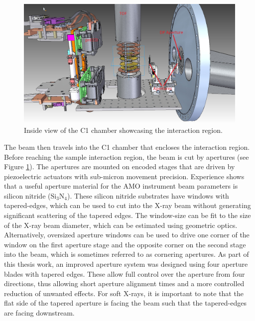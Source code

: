 \begin{figure}
	\centering
		\includegraphics[width=1.00\textwidth]{images/c1-ccd-spec.jpg}
	\caption{Inside view of the C1 chamber showcasing the interaction region.}
	\label{fig:c1-ccd-spec}
\end{figure}
%
The beam then travels into the C1 chamber that encloses the interaction region. Before reaching the sample interaction region, the beam is cut by apertures (see Figure \ref{fig:c1-ccd-spec}). The apertures are mounted on encoded stages that are driven by piezoelectric actuators with sub-micron movement precision. Experience shows that a useful aperture material for the AMO instrument beam parameters is silicon nitride ($\text{Si}_{3}\text{N}_{4}$). These silicon nitride substrates have windows with tapered-edges, which can be used to cut into the X-ray beam without generating significant scattering of the tapered edges. The window-size can be fit to the size of the X-ray beam diameter, which can be estimated using geometric optics. Alternatively, oversized aperture windows can be used to drive one corner of the window on the first aperture stage and the opposite corner on the second stage into the beam, which is sometimes referred to as cornering apertures. As part of this thesis work, an improved aperture system was designed using four aperture blades with tapered edges. These allow full control over the aperture from four directions, thus allowing short aperture alignment times and a more controlled reduction of unwanted effects. For soft X-rays, it is important to note that the flat side of the tapered aperture is facing the beam such that the tapered-edges are facing downstream.\\[1\baselineskip]
